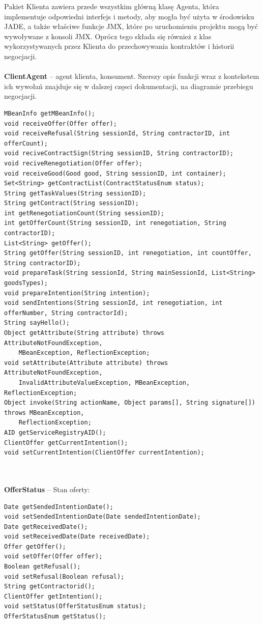 \documentclass[a4paper,12pt]{article}
\begin{document}
Pakiet Klienta zawiera przede wszystkim główną klasę Agenta, która implementuje odpowiedni interfejs i metody, aby mogła być użyta w środowisku JADE, a także właściwe funkcje JMX, które po uruchomieniu projektu mogą być wywoływane z konsoli JMX. Oprócz tego składa się również z klas wykorzystywanych przez Klienta do przechowywania kontraktów i historii negocjacji.
\\ \\
\textbf{ClientAgent} – agent klienta, konsument. Szerszy opis funkcji wraz z kontekstem ich wywołań znajduje się w dalszej częsci dokumentacji, na diagramie przebiegu negocjacji.
\begin{lstlisting}
MBeanInfo getMBeanInfo();
void receiveOffer(Offer offer);
void receiveRefusal(String sessionId, String contractorID, int offerCount);
void reciveContractSign(String sessionID, String contractorID);
void reciveRenegotiation(Offer offer);
void receiveGood(Good good, String sessionID, int container);
Set<String> getContractList(ContractStatusEnum status);
String getTaskValues(String sessionID);
String getContract(String sessionID);
int getRenegotiationCount(String sessionID);
int getOfferCount(String sessionID, int renegotiation, String contractorID);
List<String> getOffer();
String getOffer(String sessionID, int renegotiation, int countOffer, String contractorID);
void prepareTask(String sessionId, String mainSessionId, List<String> goodsTypes);
void prepareIntention(String intention);
void sendIntentions(String sessionId, int renegotiation, int offerNumber, String contractorId);
String sayHello();
Object getAttribute(String attribute) throws AttributeNotFoundException, 
	MBeanException, ReflectionException;
void setAttribute(Attribute attribute) throws AttributeNotFoundException, 
	InvalidAttributeValueException, MBeanException, ReflectionException;
Object invoke(String actionName, Object params[], String signature[]) throws MBeanException, 
	ReflectionException;
AID getServiceRegistryAID();
ClientOffer getCurrentIntention();
void setCurrentIntention(ClientOffer currentIntention);
\end{lstlisting}
\\ \\
\textbf{OfferStatus} – Stan oferty: 
\begin{lstlisting}
Date getSendedIntentionDate();
void setSendedIntentionDate(Date sendedIntentionDate);
Date getReceivedDate();
void setReceivedDate(Date receivedDate);
Offer getOffer();
void setOffer(Offer offer);
Boolean getRefusal();
void setRefusal(Boolean refusal);
String getContractorid();
ClientOffer getIntention();
void setStatus(OfferStatusEnum status);
OfferStatusEnum getStatus();
\end{lstlisting}
\end{document}
